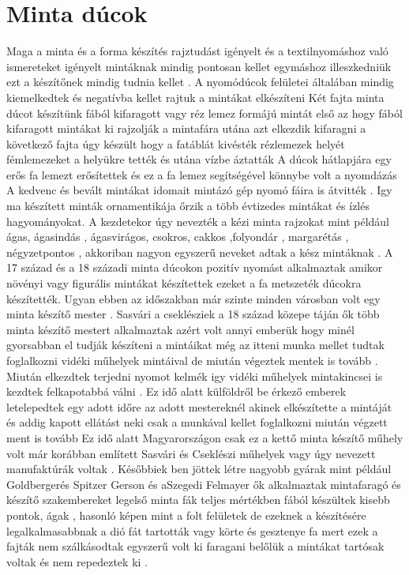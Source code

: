 \documentclass[fontsize=12pt, appendixprefix=true]{scrreprt}
\begin{document}
\section{Minta dúcok}
Maga a minta és a forma készítés rajztudást igényelt és a textilnyomáshoz való ismereteket igényelt 
mintáknak mindig pontosan kellet egymáshoz illeszkedniük  ezt a készítőnek mindig tudnia kellet .
A nyomódúcok felületei általában mindig kiemelkedtek és negatívba kellet rajtuk a mintákat elkészíteni 
Két fajta minta dúcot készítünk fából kifaragott vagy réz lemez formájú mintát 
első az hogy  fából kifaragott mintákat ki rajzolják a mintafára utána azt elkezdik kifaragni 
a következő fajta úgy készült hogy a fatáblát kivésték  rézlemezek helyét fémlemezeket a helyükre tették és utána vízbe áztatták 
A dúcok hátlapjára egy erős fa lemezt erősítettek és ez a fa lemez segítségével könnybe volt a nyomdázás
A kedvenc és bevált mintákat idomait mintázó gép nyomó fáira is átvitték .
Igy ma készített minták ornamentikája őrzik a több évtizedes mintákat és ízlés hagyományokat.
A kezdetekor úgy nevezték a kézi minta rajzokat mint például  ágas, ágasindás , ágasvirágos, csokros, cakkos ,folyondár , margarétás , négyzetpontos ,
akkoriban nagyon egyszerű neveket adtak a kész mintáknak .
A 17 század és a 18 századi minta dúcokon pozitív  nyomást alkalmaztak amikor növényi vagy figurális mintákat készítettek ezeket a fa metszeték  dúcokra készítették.
Ugyan ebben az időszakban már szinte minden városban volt egy minta készítő mester .
Sasvári a cseklésziek  a 18 század közepe táján ők több minta készítő mestert alkalmaztak azért volt annyi emberük hogy minél gyorsabban el tudják készíteni a mintáikat 
még az itteni munka mellet tudtak foglalkozni vidéki műhelyek mintáival de miután végeztek mentek is tovább .
Miután elkezdtek terjedni nyomot kelmék igy vidéki műhelyek mintakincsei is kezdtek felkapotabbá  válni .
Ez idő alatt külföldről be érkező emberek letelepedtek egy adott időre az adott mestereknél akinek elkészítette a mintáját és addig kapott ellátást neki csak a munkával kellet foglalkozni miután végzett ment is tovább 
Ez idő alatt Magyarországon csak ez a kettő minta készítő műhely volt már korábban említett Sasvári és Cseklészi műhelyek vagy úgy nevezett manufaktúrák voltak .
Későbbiek ben jöttek létre nagyobb gyárak mint például Goldbergerés Spitzer Gerson és aSzegedi Felmayer ők alkalmaztak mintafaragó és készítő szakembereket 
legelső minta fák teljes mértékben fából készültek kisebb pontok, ágak , hasonló képen mint a folt felületek de ezeknek a készítésére legalkalmasabbnak a dió fát tartották vagy körte és gesztenye fa mert ezek a fajták nem szálkásodtak  egyszerű volt ki faragani belőlük a mintákat tartósak voltak és  nem repedeztek ki .
\end{document}

